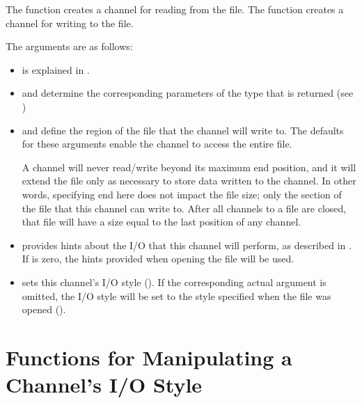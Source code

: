 \begin{protobody}
The  function creates a channel for reading from the file.
The  function creates a channel for writing to the file.

The arguments are as follows:

\begin{itemize}

\item {} is explained in .

\item {} and  determine the corresponding parameters of
      the  type that is returned (see )

\item {} and  define the region of the file that
      the channel will write to. The defaults for these arguments enable
      the channel to access the entire file.

      A channel will never read/write beyond its maximum end position,
      and it will extend the file only as necessary to store data
      written to the channel. In other words, specifying end here
      does not impact the file size; only the section of the file
      that this channel can write to. After all channels to a file
      are closed, that file will have a size equal to the last
      position of any channel.

\item {} provides hints about the I/O that this channel
      will perform, as described in .
      If  is zero, the hints provided when opening
      the file will be used.

\item {} sets this channel's I/O style ().
      If the corresponding actual argument is omitted,
      the I/O style will be set to the style specified when the file
      was opened ().

\end{itemize}

\end{protobody}


\section{Functions for Manipulating a Channel's I/O Style}
\label{IO_channel_style_mods}

